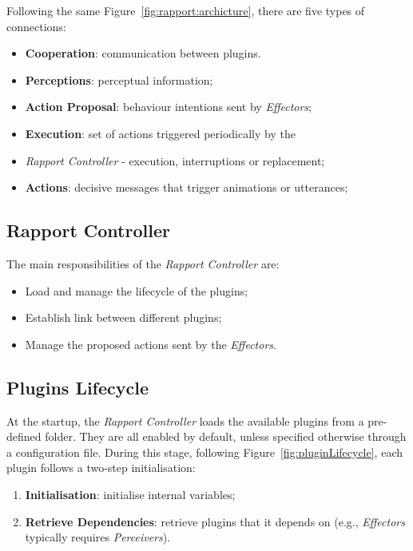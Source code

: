 Following the same Figure~\ref{fig:rapport:archicture}, there are five types of connections:
\begin{itemize}
	\item \textbf{Cooperation}: communication between plugins.
	\item \textbf{Perceptions}: perceptual information;
	\item \textbf{Action Proposal}: behaviour intentions sent by \textit{Effectors};
	\item \textbf{Execution}: set of actions triggered periodically by the 	
	\item \textit{Rapport Controller} - execution, interruptions or replacement;
	\item \textbf{Actions}: decisive messages that trigger animations or utterances;
\end{itemize}

\subsection{Rapport Controller}
\label{sec:rapportController}

The main responsibilities of the \textit{Rapport Controller} are:
\begin{itemize}
	\item Load and manage the lifecycle of the plugins;
	\item Establish link between different plugins;
	\item Manage the proposed actions sent by the \textit{Effectors}.
\end{itemize}

\subsection{Plugins Lifecycle}
\label{sub:sec:pluginLifecycle}

At the startup, the \textit{Rapport Controller} loads the available plugins from a pre-defined folder. They are all enabled by default, unless specified otherwise through a configuration file. During this stage, following Figure~\ref{fig:pluginLifecycle}, each plugin follows a two-step initialisation:
\begin{enumerate}
	\item \textbf{Initialisation}: initialise internal variables;
	\item \textbf{Retrieve Dependencies}: retrieve plugins that it depends on (e.g., \textit{Effectors} typically requires \textit{Perceivers}).
\end{enumerate}

